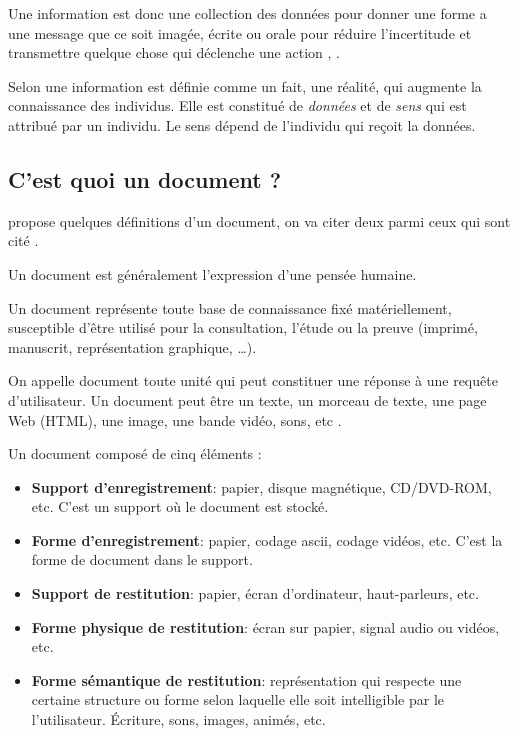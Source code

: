 Une information est donc une collection des données pour donner une forme a une message que ce soit imagée, écrite ou orale pour réduire l’incertitude et transmettre quelque chose qui déclenche une action \citep{thesaurus-ir-web}, \citep{construction-memoire-organisationnel-benayache}.

Selon \citeauthor{j-velo:sys-user} \citep{j-velo:sys-user} une information est définie comme un fait, une réalité, qui augmente la connaissance des individus. Elle est constitué de \textit{données} et de \textit{sens} qui est attribué par un individu. Le sens dépend de l'individu qui reçoit la données.

\subsection{C'est quoi un document ?}
\citeauthor{thesaurus-ir-web} propose quelques définitions d'un document, on va citer deux parmi ceux qui sont cité \citep{thesaurus-ir-web}.

\begin{definition}
    Un document est généralement l'expression d'une pensée humaine.
\end{definition}

\begin{definition}
    Un document représente toute base de connaissance fixé matériellement, susceptible d'être utilisé pour la consultation, l'étude ou la preuve (imprimé, manuscrit, représentation graphique, \dots).
\end{definition}

\begin{definition}
    On appelle document toute unité qui peut constituer une réponse à une requête d'utilisateur. Un document peut être un texte, un morceau de texte, une page Web (HTML), une image, une bande vidéo, sons, etc \citep{salton1989automatique}.
\end{definition}

Un document composé de cinq éléments \citep{thesaurus-ir-web}:
\begin{itemize}
    \item \textbf{Support d'enregistrement}: papier, disque magnétique, CD/DVD-ROM, etc. C'est un support où le document est stocké.
    \item \textbf{Forme d'enregistrement}: papier, codage ascii, codage vidéos, etc. C'est la forme de document dans le support.
    \item \textbf{Support de restitution}: papier, écran d'ordinateur, haut-parleurs, etc.
    \item \textbf{Forme physique de restitution}: écran sur papier, signal audio ou vidéos, etc.
    \item \textbf{Forme sémantique de restitution}: représentation qui respecte une certaine structure ou forme selon laquelle elle soit intelligible par le l'utilisateur. Écriture, sons, images, animés, etc.
\end{itemize}

